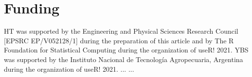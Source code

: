 \documentclass[10pt,letterpaper]{article}
\begin{document}
\section*{Funding}
HT was supported by the Engineering and Physical Sciences Research Council [EPSRC EP/V052128/1] during the preparation of this article and by The R Foundation for Statistical Computing during the organization of useR! 2021.
YBS was supported by the Instituto Nacional de Tecnología Agropecuaria, Argentina during the organization of useR! 2021.
... ...







\end{document}
